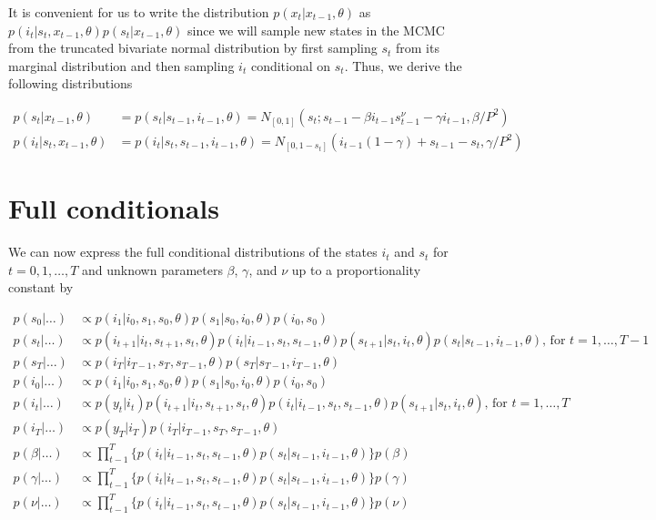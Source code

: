 \documentclass{article}
\begin{document}
It is convenient for us to write the distribution $p(x_t|x_{t-1},\theta)$ as $p(i_t|s_t,x_{t-1},\theta)p(s_t|x_{t-1},\theta)$ since we will sample new states in the MCMC from the truncated bivariate normal distribution by first sampling $s_t$ from its marginal distribution and then sampling $i_t$ conditional on $s_t$. Thus, we derive the following distributions

\begin{align*}
p(s_t|x_{t-1},\theta) &= p(s_t|s_{t-1},i_{t-1},\theta) = N_{[0,1]}(s_t; s_{t-1} - \beta i_{t-1}s^{\nu}_{t-1} - \gamma i_{t-1}, \beta / P^2) \\
p(i_t|s_t,x_{t-1},\theta) &= p(i_t|s_t,s_{t-1},i_{t-1},\theta) = N_{[0,1-s_t]}(i_{t-1}(1 - \gamma) + s_{t-1} - s_t, \gamma / P^2)
\end{align*}

\section{Full conditionals}
We can now express the full conditional distributions of the states $i_t$ and $s_t$ for $t = 0, 1, \ldots, T$ and unknown parameters $\beta$, $\gamma$, and $\nu$ up to a proportionality constant by

\begin{align*}
p(s_0|\hdots) &\propto p(i_1|i_0,s_1,s_0,\theta)p(s_1|s_0,i_0,\theta)p(i_0,s_0)\\
p(s_t|\hdots) &\propto p(i_{t+1}|i_t,s_{t+1},s_t,\theta)p(i_t|i_{t-1},s_t,s_{t-1},\theta)p(s_{t+1}|s_t,i_t,\theta)p(s_t|s_{t-1},i_{t-1},\theta) \mbox{, for } t = 1,\ldots,T-1 \\
p(s_T|\hdots) &\propto p(i_T|i_{T-1},s_T,s_{T-1},\theta)p(s_T|s_{T-1},i_{T-1},\theta) \\
p(i_0|\hdots) &\propto p(i_1|i_0,s_1,s_0,\theta)p(s_1|s_0,i_0,\theta)p(i_0,s_0) \\
p(i_t|\hdots) &\propto p(y_t|i_t)p(i_{t+1}|i_t,s_{t+1},s_t,\theta)p(i_t|i_{t-1},s_t,s_{t-1},\theta)p(s_{t+1}|s_t,i_t,\theta) \mbox{, for } t = 1,\ldots,T \\
p(i_T|\hdots) &\propto p(y_T|i_T)p(i_T|i_{T-1},s_T,s_{T-1},\theta) \\
p(\beta|\hdots) &\propto \prod_{t-1}^T \{p(i_t|i_{t-1},s_t,s_{t-1},\theta)p(s_t|s_{t-1},i_{t-1},\theta)\}p(\beta) \\
p(\gamma|\hdots) &\propto \prod_{t-1}^T \{p(i_t|i_{t-1},s_t,s_{t-1},\theta)p(s_t|s_{t-1},i_{t-1},\theta)\}p(\gamma) \\
p(\nu|\hdots) &\propto \prod_{t-1}^T \{p(i_t|i_{t-1},s_t,s_{t-1},\theta)p(s_t|s_{t-1},i_{t-1},\theta)\}p(\nu)
\end{align*}
\end{document}
